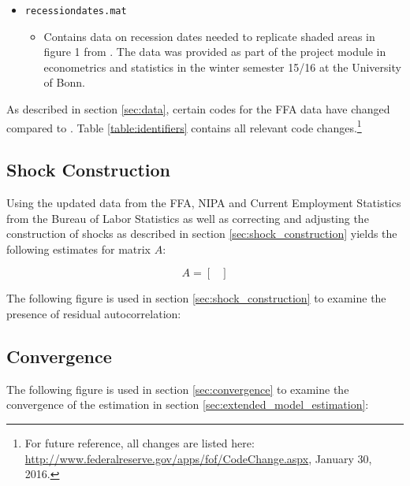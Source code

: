 \begin{itemize}
\item \texttt{recessiondates.mat}
	\begin{itemize}
		\item Contains data on recession dates needed to replicate shaded areas in figure 1 from \cite{JERMANNfinancial}. The data was provided as part of the project module in econometrics and statistics in the winter semester 15/16 at the University of Bonn.
	\end{itemize}

\end{itemize}

As described in section \ref{sec:data}, certain codes for the FFA data have changed compared to \citeauthor{JERMANNfinancial}. Table \ref{table:identifiers} contains all relevant code changes.\footnote{For future reference, all changes are listed here: \href{http://www.federalreserve.gov/apps/fof/CodeChange.aspx}{http://www.federalreserve.gov/apps/fof/CodeChange.aspx}, January 30, 2016.} 




\subsection{Shock Construction}
\label{sec:appendix_shock_construction}

Using the updated data from the FFA, NIPA and Current Employment Statistics from the Bureau of Labor Statistics as well as correcting and adjusting the construction of shocks as described in section \ref{sec:shock_construction} yields the following estimates for matrix $A$:
\begin{center}
\[
    A=
      \begin{bmatrix}
    	
      \end{bmatrix}
\]
\end{center}

The following figure is used in section \ref{sec:shock_construction} to examine the presence of residual autocorrelation:




\subsection{Convergence}
\label{sec:appendix_convergence}

The following figure is used in section \ref{sec:convergence} to examine the convergence of the estimation in section \ref{sec:extended_model_estimation}:



